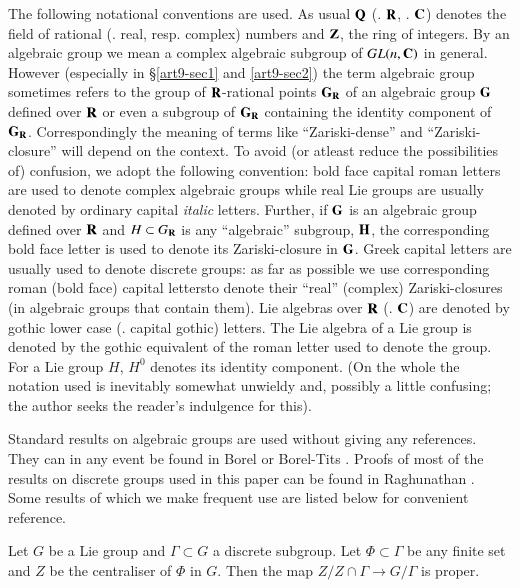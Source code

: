 The following notational conventions are used.  As usual $\mathbf{Q}$ (\resp. $\mathbf{R}$, \resp. $\mathbf{C}$) denotes the field of rational (\resp. real, resp. complex) numbers and $\mathbf{Z}$, the ring of integers. By an algebraic group we mean a complex algebraic subgroup of $GL(n, \mathbf{C})$ in general. However (especially in \S \ref{art9-sec1} and \ref{art9-sec2}) the term algebraic group sometimes refers to the group of $\mathbf{R}$-rational points $\mathbf{G}_{\mathbf{R}}$ of an algebraic group $\mathbf{G}$ defined over $\mathbf{R}$ or even a subgroup of $\mathbf{G}_{\mathbf{R}}$ containing the identity component of $\mathbf{G}_{\mathbf{R}}$. Correspondingly the meaning of terms like ``Zariski-dense'' and ``Zariski-closure'' will depend on the context. To avoid (or atleast reduce the possibilities of) confusion, we adopt the following convention: bold face capital roman letters are used to denote complex algebraic groups while real Lie groups are usually denoted by ordinary capital \textit{italic} letters. Further, if $\mathbf{G}$ is an algebraic group defined over $\mathbf{R}$ and $H \subset G_{\mathbf{R}}$ is any ``algebraic'' subgroup, $\mathbf{H}$, the corresponding bold face letter is used to denote its Zariski-closure in $\mathbf{G}$. Greek capital letters are usually used to denote discrete groups: as far as possible we use corresponding roman (bold face) capital letters\pageoriginale  to denote their ``real'' (complex) Zariski-closures (in algebraic groups that contain them). Lie algebras over $\mathbf{R}$ (\resp. $\mathbf{C}$) are denoted by gothic lower case (\resp. capital gothic) letters. The Lie algebra of a Lie group is denoted by the gothic equivalent of the roman letter used to denote the group. For a Lie group $H$, $H^0$ denotes its identity component. (On the whole the notation used is inevitably somewhat unwieldy and, possibly a little confusing; the author seeks the reader's indulgence for this).

Standard results on algebraic groups are used without giving any references. They can in any event be found in Borel \cite{art9-borel-3} or Borel-Tits \cite{art9-borel-tits-2}. Proofs of most of the results on discrete groups used in this paper can be found in Raghunathan \cite{art9-raghunathan-1}. Some results of which we make frequent use are listed below for convenient reference.

\begin{romanlemma}\label{art9-romanlem1}
Let $G$ be a Lie group and $\Gamma \subset G$ a discrete subgroup. Let $\Phi \subset \Gamma$ be any finite set and $Z$ be the centraliser of $\Phi$ in $G$. Then the map $Z/ Z \cap \Gamma \to G/ \Gamma$ is proper.
\end{romanlemma}

